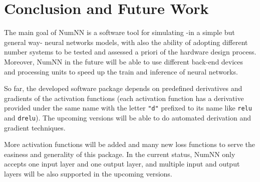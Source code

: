 \section{Conclusion and Future Work}

The main goal of NumNN is a software tool for simulating -in a simple but general way- neural networks models, with also the ability of adopting different number systems to be tested and assessed a priori of the hardware design process. Moreover, NumNN in the future will be able to use different back-end devices and processing units to speed up the train and inference of neural networks. 

So far, the developed software package depends on predefined derivatives and gradients of the activation functions (each activation function has a derivative provided under the same name with the letter \texttt{"d"} prefixed to its name like \texttt{relu} and \texttt{drelu}). The upcoming versions will be able to do automated derivation and gradient techniques.

More activation functions will be added and many new loss functions to serve the easiness and generality of this package. In the current status, NumNN only accepts one input layer and one output layer, and multiple input and output layers will be also supported in the upcoming versions.



